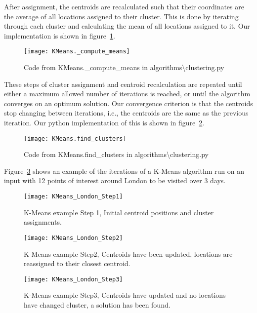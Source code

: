 \noindent
After assignment, the centroids are recalculated such that their coordinates are the average of all locations
assigned to their cluster.
This is done by iterating through each cluster and calculating the mean of all locations assigned to it.
Our implementation is shown in figure~\ref{fig:KMeans._compute_means}.
\begin{figure}[H]
    \centering
    \texttt{[image: KMeans.\_compute\_means]}
    \caption{Code from KMeans.\_compute\_means in algorithms\textbackslash clustering.py}
    \label{fig:KMeans._compute_means}
\end{figure}

\noindent
These steps of cluster assignment and centroid recalculation are repeated until either a maximum allowed number of
iterations is reached, or until the algorithm converges on an optimum solution.
Our convergence criterion is that the centroids stop changing between iterations, i.e., the centroids are the same
as the previous iteration.
Our python implementation of this is shown in figure~\ref{fig:KMeans.find_clusters}.
\begin{figure}[H]
    \centering
    \texttt{[image: KMeans.find\_clusters]}
    \caption{Code from KMeans.find\_clusters in algorithms\textbackslash clustering.py}
    \label{fig:KMeans.find_clusters}
\end{figure}

\noindent
Figure~\ref{fig:KMeans_London_Step1} shows an example of the iterations of a K-Means algorithm run on an input with
12 points of interest around London to be visited over 3 days.
\begin{figure}[H]
    \ContinuedFloat*
    \texttt{[image: KMeans\_London\_Step1]}
    \caption{K-Means example Step 1, Initial centroid positions and cluster assignments.}
    \label{fig:KMeans_London_Step1}
\end{figure}
\begin{figure}[H]
    \ContinuedFloat
    \texttt{[image: KMeans\_London\_Step2]}
    \caption{K-Means example Step2, Centroids have been updated, locations are reassigned to their closest centroid.}
    \label{fig:KMeans_London_Step2}
\end{figure}
\begin{figure}[H]
    \ContinuedFloat
    \texttt{[image: KMeans\_London\_Step3]}
    \caption{K-Means example Step3, Centroids have updated and no locations have changed cluster, a solution has been found.}
    \label{fig:KMeans_London_Step3}
\end{figure}

